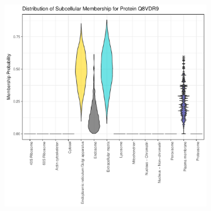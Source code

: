 \documentclass[12pt,english]{article}\usepackage[]{graphicx}\usepackage[]{color}
\makeatletter
\def\maxwidth{ %
  \ifdim\Gin@nat@width>\linewidth
    \linewidth
  \else
    \Gin@nat@width
  \fi
}
\newenvironment{knitrout}{}{} %
\makeatother
\begin{document}
\begin{figure}[h]
  \centering
  \begin{subfigure}[t]{0.5\textwidth}
    \centering
\begin{knitrout}
\color{fgcolor}

{\centering \includegraphics[width=\maxwidth]{figure/unnamed-chunk-20-1} 

}



\end{knitrout}
    \caption{}
  \end{subfigure}%
  \begin{subfigure}[t]{0.5\textwidth}
    \centering
\begin{knitrout}
\color{fgcolor}


\end{knitrout}
\end{subfigure}
\end{figure}
\end{document}
